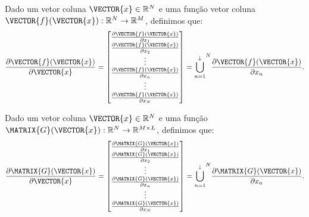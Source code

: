 \begin{definition}\label{def:deltaver2}
Dado 
um vetor coluna $\VECTOR{x}\in \mathbb{R}^N$ e 
uma função vetor coluna $\VECTOR{f}(\VECTOR{x}): \mathbb{R}^N \rightarrow \mathbb{R}^M$, 
definimos que:
\begin{equation}
\frac{\partial \VECTOR{f}(\VECTOR{x}) }{\partial \VECTOR{x}}= 
\left[
\begin{matrix}
\frac{\partial \VECTOR{f}(\VECTOR{x}) }{\partial x_{1}} \\
\frac{\partial \VECTOR{f}(\VECTOR{x}) }{\partial x_{2}} \\
\vdots \\
\frac{\partial \VECTOR{f}(\VECTOR{x}) }{\partial x_{n}} \\
\vdots \\
\frac{\partial \VECTOR{f}(\VECTOR{x}) }{\partial x_{N}}
\end{matrix}
\right] =  
{\bigcup\limits_{n=1}^{\downarrow}}^{N}{\frac{\partial \VECTOR{f}(\VECTOR{x}) }{\partial x_{n}}}.
\end{equation}
\end{definition}

\begin{definition}\label{def:deltaver3}
Dado 
um vetor coluna $\VECTOR{x}\in \mathbb{R}^N$ e 
uma função $\MATRIX{G}(\VECTOR{x}): \mathbb{R}^N \rightarrow \mathbb{R}^{M\times L}$, 
definimos que:
\begin{equation}
\frac{\partial \MATRIX{G}(\VECTOR{x}) }{\partial \VECTOR{x}}= 
\left[
\begin{matrix}
\frac{\partial \MATRIX{G}(\VECTOR{x}) }{\partial x_{1}} \\
\frac{\partial \MATRIX{G}(\VECTOR{x}) }{\partial x_{2}} \\
\vdots \\
\frac{\partial \MATRIX{G}(\VECTOR{x}) }{\partial x_{n}} \\
\vdots \\
\frac{\partial \MATRIX{G}(\VECTOR{x}) }{\partial x_{N}}
\end{matrix}
\right] = {\bigcup\limits_{n=1}^{\downarrow}}^{N}{\frac{\partial \MATRIX{G}(\VECTOR{x}) }{\partial x_{n}}}.
\end{equation}
\end{definition}

